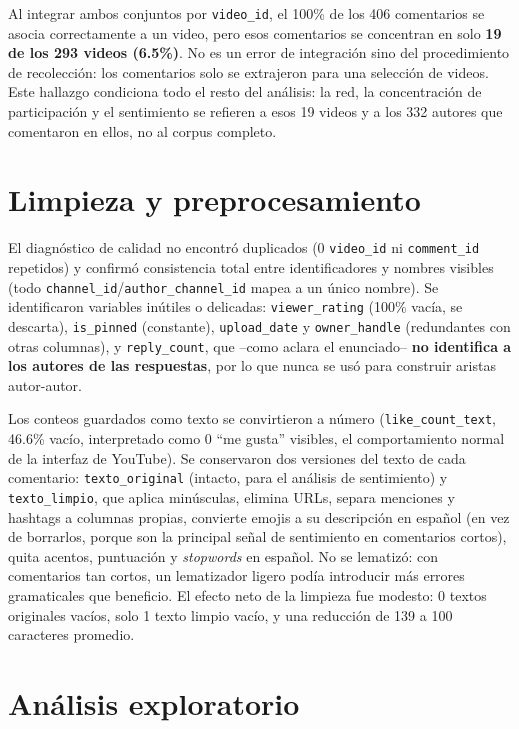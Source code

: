 \documentclass[11pt]{article}
\begin{document}
Al integrar ambos conjuntos por \texttt{video\_id}, el 100\% de los 406 comentarios
se asocia correctamente a un video, pero esos comentarios se concentran en solo
\textbf{19 de los 293 videos (6.5\%)}. No es un error de integraci\'on sino del
procedimiento de recolecci\'on: los comentarios solo se extrajeron para una
selecci\'on de videos. Este hallazgo condiciona todo el resto del an\'alisis: la red,
la concentraci\'on de participaci\'on y el sentimiento se refieren a esos 19 videos y
a los 332 autores que comentaron en ellos, no al corpus completo.

\section{Limpieza y preprocesamiento}

El diagn\'ostico de calidad no encontr\'o duplicados (0 \texttt{video\_id} ni
\texttt{comment\_id} repetidos) y confirm\'o consistencia total entre identificadores
y nombres visibles (todo \texttt{channel\_id}/\texttt{author\_channel\_id} mapea a un
\'unico nombre). Se identificaron variables in\'utiles o delicadas: \texttt{viewer\_rating}
(100\% vac\'ia, se descarta), \texttt{is\_pinned} (constante), \texttt{upload\_date} y
\texttt{owner\_handle} (redundantes con otras columnas), y \texttt{reply\_count}, que
--como aclara el enunciado-- \textbf{no identifica a los autores de las respuestas},
por lo que nunca se us\'o para construir aristas autor-autor.

Los conteos guardados como texto se convirtieron a n\'umero (\texttt{like\_count\_text},
46.6\% vac\'io, interpretado como 0 ``me gusta'' visibles, el comportamiento normal de
la interfaz de YouTube). Se conservaron dos versiones del texto de cada comentario:
\texttt{texto\_original} (intacto, para el an\'alisis de sentimiento) y
\texttt{texto\_limpio}, que aplica min\'usculas, elimina URLs, separa menciones y
hashtags a columnas propias, convierte emojis a su descripci\'on en espa\~nol (en vez
de borrarlos, porque son la principal se\~nal de sentimiento en comentarios cortos),
quita acentos, puntuaci\'on y \emph{stopwords} en espa\~nol. No se lematiz\'o: con
comentarios tan cortos, un lematizador ligero pod\'ia introducir m\'as errores
gramaticales que beneficio. El efecto neto de la limpieza fue modesto: 0 textos
originales vac\'ios, solo 1 texto limpio vac\'io, y una reducci\'on de 139 a 100
caracteres promedio.

\section{An\'alisis exploratorio}
\end{document}

